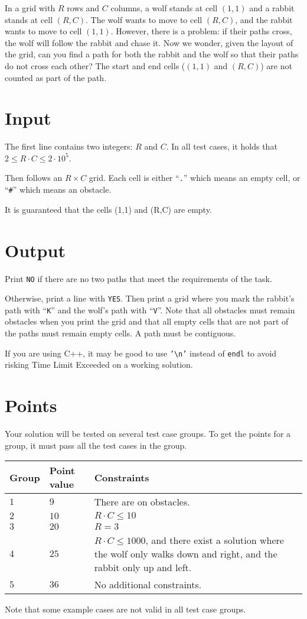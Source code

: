 \noindent
In a grid with $R$ rows and $C$ columns, a wolf stands at cell $(1, 1)$ and a rabbit stands at cell $(R, C)$.
The wolf wants to move to cell $(R, C)$, and the rabbit wants to move to cell $(1, 1)$.
However, there is a problem: if their paths cross, the wolf will follow the rabbit and chase it.
Now we wonder, given the layout of the grid, can you find a path for both the rabbit and the wolf so that their paths do not cross each other?
The start and end cells ($(1, 1)$ and $(R, C)$) are not counted as part of the path.

\section*{Input}
The first line contains two integers: $R$ and $C$. In all test cases, it holds that $2 \leq R \cdot C \leq 2 \cdot 10^5$.

Then follows an $R \times C$ grid. Each cell is either ``\texttt{.}'' which means an empty cell, or ``\texttt{\#}'' which means an obstacle.

It is guaranteed that the cells (1,1) and (R,C) are empty.

\section*{Output}
Print \texttt{NO} if there are no two paths that meet the requirements of the task.

Otherwise, print a line with \texttt{YES}.
Then print a grid where you mark the rabbit's path with ``\texttt{K}'' and the wolf's path with ``\texttt{V}''.
Note that all obstacles must remain obstacles when you print the grid and that all empty cells that are not part of the paths must remain empty cells.
A path must be contiguous.

If you are using C++, it may be good to use \texttt{'\textbackslash{}n'} instead of \texttt{endl} to avoid risking Time Limit Exceeded on a working solution.

\section*{Points}
Your solution will be tested on several test case groups.
To get the points for a group, it must pass all the test cases in the group.

\noindent
\begin{tabular}{| l | l | l |}
  \hline
  \textbf{Group} & \textbf{Point value} & \textbf{Constraints} \\ \hline
  $1$   & $9$        & There are on obstacles. \\ \hline
  $2$   & $10$       & $R \cdot C \leq 10$  \\ \hline
  $3$   & $20$       & $R = 3$  \\ \hline
  $4$   & $25$       & $R \cdot C \leq 1000$, and there exist a solution where the wolf only walks down and right, and the rabbit only up and left. \\ \hline
  $5$   & $36$       & No additional constraints. \\ \hline
\end{tabular}

Note that some example cases are not valid in all test case groups.
